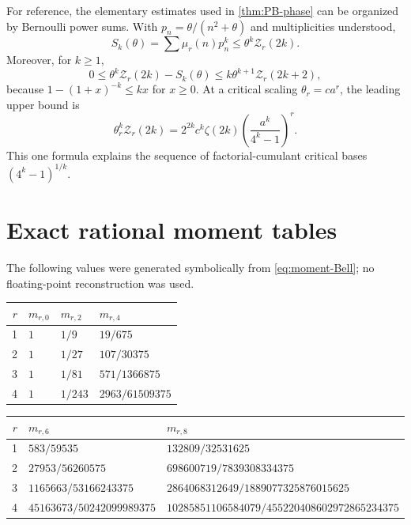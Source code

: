 \documentclass[11pt,oneside]{article}
\theoremstyle{definition}
\theoremstyle{remark}
\newcommand{\ZetaR}{\mathcal Z}
\begin{document}
For reference, the elementary estimates used in
\cref{thm:PB-phase} can be organized by Bernoulli power sums.  With
$p_n=\theta/(n^2+\theta)$ and multiplicities understood,
\begin{equation}\label{eq:power-bound-app}
 S_k(\theta)=\sum\mu_r(n)p_n^k\leq\theta^k\ZetaR_r(2k).
\end{equation}
Moreover, for $k\geq1$,
\begin{equation}\label{eq:power-error-app}
 0\leq\theta^k\ZetaR_r(2k)-S_k(\theta)
 \leq k\theta^{k+1}\ZetaR_r(2k+2),
\end{equation}
because $1-(1+x)^{-k}\leq kx$ for $x\geq0$.  At a critical scaling
$\theta_r=ca^r$, the leading upper bound is
\begin{equation}\label{eq:power-scale-app}
 \theta_r^k\ZetaR_r(2k)
 =2^{2k}c^k\zeta(2k)
 \left(\frac{a^k}{4^k-1}\right)^r.
\end{equation}
This one formula explains the sequence of factorial-cumulant critical bases
$(4^k-1)^{1/k}$.

\section{Exact rational moment tables}

The following values were generated symbolically from
\eqref{eq:moment-Bell}; no floating-point reconstruction was used.

\begin{center}
\begin{tabular}{@{}rlll@{}}
\toprule
$r$ & $m_{r,0}$ & $m_{r,2}$ & $m_{r,4}$\\
\midrule
1 & $1$ & $1/9$ & $19/675$\\
2 & $1$ & $1/27$ & $107/30375$\\
3 & $1$ & $1/81$ & $571/1366875$\\
4 & $1$ & $1/243$ & $2963/61509375$\\
\bottomrule
\end{tabular}
\end{center}

\begin{center}
\small
\begin{tabular}{@{}rll@{}}
\toprule
$r$ & $m_{r,6}$ & $m_{r,8}$\\
\midrule
1 & $583/59535$ & $132809/32531625$\\
2 & $27953/56260575$ & $698600719/7839308334375$\\
3 & $1165663/53166243375$ & $2864068312649/1889077325876015625$\\
4 & $45163673/50242099989375$ & $10285851106584079/455220408602972865234375$\\
\bottomrule
\end{tabular}
\end{center}
\end{document}

